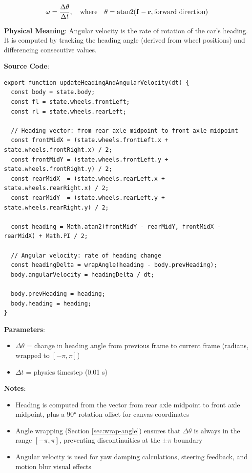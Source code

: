 \begin{equation}
  \omega = \frac{\Delta \theta}{\Delta t}, \quad \text{where} \quad \theta = \text{atan2}(\mathbf{f} - \mathbf{r}, \text{forward direction})
  \label{eq:angular-velocity}
\end{equation}

\textbf{Physical Meaning}: Angular velocity is the rate of rotation of the car's heading. It is computed by tracking the heading angle (derived from wheel positions) and differencing consecutive values.

\textbf{Source Code}: 

\begin{lstlisting}[caption={Heading and angular velocity computation}]
export function updateHeadingAndAngularVelocity(dt) {
  const body = state.body;
  const fl = state.wheels.frontLeft;
  const rl = state.wheels.rearLeft;

  // Heading vector: from rear axle midpoint to front axle midpoint
  const frontMidX = (state.wheels.frontLeft.x + state.wheels.frontRight.x) / 2;
  const frontMidY = (state.wheels.frontLeft.y + state.wheels.frontRight.y) / 2;
  const rearMidX  = (state.wheels.rearLeft.x + state.wheels.rearRight.x) / 2;
  const rearMidY  = (state.wheels.rearLeft.y + state.wheels.rearRight.y) / 2;

  const heading = Math.atan2(frontMidY - rearMidY, frontMidX - rearMidX) + Math.PI / 2;

  // Angular velocity: rate of heading change
  const headingDelta = wrapAngle(heading - body.prevHeading);
  body.angularVelocity = headingDelta / dt;

  body.prevHeading = heading;
  body.heading = heading;
}
\end{lstlisting}

\textbf{Parameters}:
\begin{itemize}
  \item $\Delta \theta$ = change in heading angle from previous frame to current frame (radians, wrapped to $[-\pi, \pi]$)
  \item $\Delta t$ = physics timestep (0.01 s)
\end{itemize}

\textbf{Notes}:
\begin{itemize}
  \item Heading is computed from the vector from rear axle midpoint to front axle midpoint, plus a 90° rotation offset for canvas coordinates
  \item Angle wrapping (Section \ref{sec:wrap-angle}) ensures that $\Delta \theta$ is always in the range $[-\pi, \pi]$, preventing discontinuities at the $\pm\pi$ boundary
  \item Angular velocity is used for yaw damping calculations, steering feedback, and motion blur visual effects
\end{itemize}

